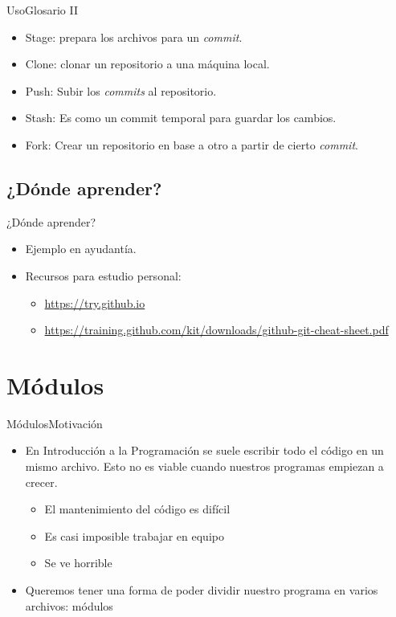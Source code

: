 \documentclass[spanish]{beamer}
\begin{document}
\begin{frame}{Uso}{Glosario II}
    \begin{itemize}
        \item \alert{Stage}: prepara los archivos para un \textit{commit}.
        \item \alert{Clone}: clonar un repositorio a una máquina local.
        \item \alert{Push}: Subir los \textit{commits} al repositorio.
        \item \alert{Stash}: Es como un commit temporal para guardar los cambios.
        \item \alert{Fork}: Crear un repositorio en base a otro a partir de cierto \textit{commit}.
    \end{itemize}
\end{frame}

\subsection{¿Dónde aprender?}
\begin{frame}{¿Dónde aprender?}
    \begin{itemize}
        \item Ejemplo en ayudantía.
        \pause
        \item Recursos para estudio personal:
        \begin{itemize}
            \item \url{https://try.github.io}
            \item \url{https://training.github.com/kit/downloads/github-git-cheat-sheet.pdf}
        \end{itemize}
    \end{itemize}
\end{frame}


\section{Módulos}
\begin{frame}{Módulos}{Motivación}
  \begin{itemize}
    \item En Introducción a la Programación se suele escribir todo el código en un mismo archivo. \alert{Esto no es viable cuando nuestros programas empiezan a crecer.}
          \pause
          \begin{itemize}
            \item El mantenimiento del código es difícil
                  \pause
            \item Es casi imposible trabajar en equipo
                  \pause
            \item Se ve horrible
          \end{itemize}
          \pause
    \item Queremos tener una forma de poder dividir nuestro programa en varios archivos: \pause \alert{módulos}
            
  \end{itemize}
   
\end{frame}
\end{document}
